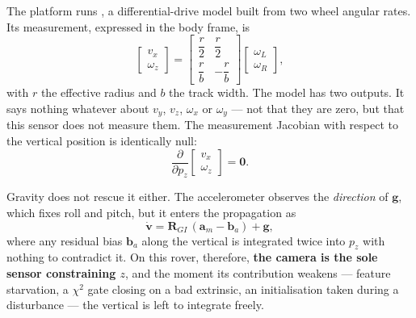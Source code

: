 The platform runs , a differential-drive model
built from two wheel angular rates. Its measurement, expressed in the body
frame, is
\begin{equation}
\begin{bmatrix} v_x \\ \omega_z \end{bmatrix}
  = \begin{bmatrix} \dfrac{r}{2} & \dfrac{r}{2} \\[6pt]
                    \dfrac{r}{b} & -\dfrac{r}{b} \end{bmatrix}
    \begin{bmatrix} \omega_L \\ \omega_R \end{bmatrix},
\label{eq:wheel2d}
\end{equation}
with $r$ the effective radius and $b$ the track width. The model has two
outputs. It says nothing whatever about $v_y$, $v_z$, $\omega_x$ or
$\omega_y$ --- not that they are zero, but that this sensor does not
measure them. The measurement Jacobian with respect to the vertical
position is identically null:
\begin{equation}
\frac{\partial}{\partial p_z}
  \begin{bmatrix} v_x \\ \omega_z \end{bmatrix} = \mathbf{0}.
\label{eq:wheelnoz}
\end{equation}

Gravity does not rescue it either. The accelerometer observes the
\emph{direction} of $\mathbf{g}$, which fixes roll and pitch, but it enters
the propagation as
\begin{equation}
\dot{\mathbf{v}} = \mathbf{R}_{GI}\,(\mathbf{a}_m - \mathbf{b}_a) + \mathbf{g},
\end{equation}
where any residual bias $\mathbf{b}_a$ along the vertical is integrated
twice into $p_z$ with nothing to contradict it. On this rover, therefore,
\textbf{the camera is the sole sensor constraining $z$}, and the moment its
contribution weakens --- feature starvation, a $\chi^2$ gate closing on a
bad extrinsic, an initialisation taken during a disturbance --- the
vertical is left to integrate freely.

